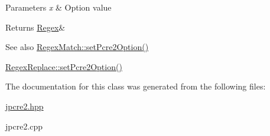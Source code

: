 \begin{DoxyParams}{Parameters}
{\em x} & Option value \\
\hline
\end{DoxyParams}
\begin{DoxyReturn}{Returns}
\hyperlink{classjpcre2_1_1Regex}{Regex}\& 
\end{DoxyReturn}
\begin{DoxySeeAlso}{See also}
\hyperlink{classjpcre2_1_1RegexMatch_ae4ab558c2bec0bc9639dbca70ab47496_ae4ab558c2bec0bc9639dbca70ab47496}{Regex\+Match\+::set\+Pcre2\+Option()} 

\hyperlink{classjpcre2_1_1RegexReplace_aec36272d351fdc3a8cb02a4a3efea5a2_aec36272d351fdc3a8cb02a4a3efea5a2}{Regex\+Replace\+::set\+Pcre2\+Option()} 
\end{DoxySeeAlso}


The documentation for this class was generated from the following files\+:\begin{DoxyCompactItemize}
\item 
\hyperlink{jpcre2_8hpp}{jpcre2.\+hpp}\item 
jpcre2.\+cpp\end{DoxyCompactItemize}
